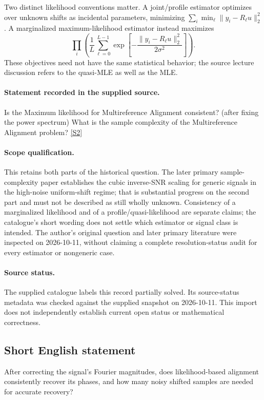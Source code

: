 \documentclass[11pt]{article}
\begin{document}
Two distinct likelihood conventions matter. A joint/profile estimator optimizes over unknown shifts as incidental parameters, minimizing $\sum_i\min_\ell\|y_i-R_\ell u\|_2^2$. A marginalized maximum-likelihood estimator instead maximizes
\[
 \prod_i\left(\frac1L\sum_{\ell=0}^{L-1}
 \exp\left[-\frac{\|y_i-R_\ell u\|_2^2}{2\sigma^2}\right]\right).
\]
These objectives need not have the same statistical behavior; the source lecture discussion refers to the quasi-MLE as well as the MLE.
\paragraph{Statement recorded in the supplied source.}
Is the Maximum likelihood for Multireference Alignment consistent? (after fixing the power spectrum) What is the sample complexity of the Multireference Alignment problem? \href{https://afonsobandeira.wordpress.com/2015/12/09/42l10psynchronization/}{[S2]}
\paragraph{Scope qualification.}
This retains both parts of the historical question. The later primary sample-complexity paper establishes the cubic inverse-SNR scaling for generic signals in the high-noise uniform-shift regime; that is substantial progress on the second part and must not be described as still wholly unknown. Consistency of a marginalized likelihood and of a profile/quasi-likelihood are separate claims; the catalogue's short wording does not settle which estimator or signal class is intended. The author's original question and later primary literature were inspected on 2026-10-11, without claiming a complete resolution-status audit for every estimator or nongeneric case.
\paragraph{Source status.}
The supplied catalogue labels this record partially solved. Its source-status metadata was checked against the supplied snapshot on 2026-10-11. This import does not independently establish current open status or mathematical correctness.
\subsection{Short English statement}
After correcting the signal's Fourier magnitudes, does likelihood-based alignment consistently recover its phases, and how many noisy shifted samples are needed for accurate recovery?
\end{document}
